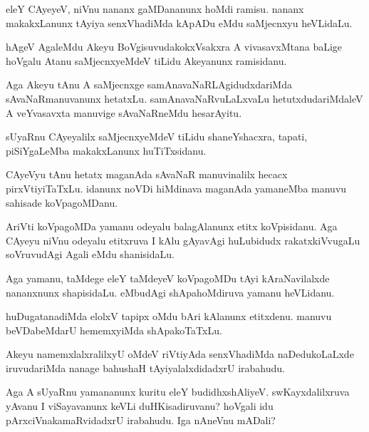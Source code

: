 \documentclass{article}
\begin{document}
\begin{mn}
eleY CAyeyeV, niVnu nananx gaMDananunx hoMdi ramisu. nananx
makakxLanunx tAyiya senxVhadiMda kApADu eMdu saMjecnxyu heVLidaLu.
\end{mn}

\begin{mn}
hAgeV AgaleMdu Akeyu BoVgisuvudakokxVsakxra A vivasavxMtana baLige
hoVgalu Atanu saMjecnxyeMdeV tiLidu Akeyanunx ramisidanu.
\end{mn}

\begin{mn}
Aga Akeyu tAnu A saMjecnxge samAnavaNaRLAgidudxdariMda
sAvaNaRmanuvanunx hetatxLu. samAnavaNaRvuLaLxvaLu hetutxdudariMdaleV A
veYvasavxta manuvige sAvaNaRneMdu hesarAyitu.
\end{mn}

\begin{mn}%
sUyaRnu CAyeyalilx saMjecnxyeMdeV tiLidu shaneYshacxra, tapati,
piSiYgaLeMba makakxLanunx huTiTxsidanu.
\end{mn}

\begin{mn}
CAyeVyu tAnu hetatx maganAda sAvaNaR manuvinalilx hecacx
pirxVtiyiTaTxLu. idanunx noVDi hiMdinava maganAda yamaneMba manuvu
sahisade koVpagoMDanu.
\end{mn}

\begin{mn}
AriVti koVpagoMDa yamanu odeyalu balagAlanunx etitx koVpisidanu. Aga
CAyeyu niVnu odeyalu etitxruva I kAlu gAyavAgi huLubidudx
rakatxkiVvugaLu soVruvudAgi Agali eMdu shanisidaLu.
\end{mn}

\begin{mn}%
Aga yamanu, taMdege eleY taMdeyeV koVpagoMDu tAyi kAraNavilalxde
nananxnunx shapisidaLu. eMbudAgi shApahoMdiruva yamanu heVLidanu.
\end{mn}

\begin{mn}
huDugatanadiMda elolxV tapipx oMdu bAri kAlanunx etitxdenu. manuvu
beVDabeMdarU hememxyiMda shApakoTaTxLu.
\end{mn}

\begin{mn}%
Akeyu namemxlalxralilxyU oMdeV riVtiyAda senxVhadiMda naDedukoLaLxde
iruvudariMda nanage bahushaH tAyiyalalxdidadxrU irabahudu.
\end{mn}

\begin{mn}
Aga A sUyaRnu yamananunx kuritu eleY budidhxshAliyeV. swKayxdalilxruva
yAvanu I viSayavanunx keVLi duHKisadiruvanu? hoVgali idu
pArxciVnakamaRvidadxrU irabahudu. Iga nAneVnu mADali?
\end{mn}
\end{document}
